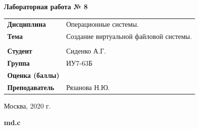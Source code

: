 \documentclass[a4paper,14pt]{extreport} %
\begin{document}
\begin{titlepage}
    \vspace{2cm}

    \begin{center}
        \textbf{Лабораторная работа № 8} \\
        \vspace{0.5cm}
    \end{center}

    \vspace{4cm}

    \begin{flushleft}
        \begin{tabular}{ll}
            \textbf{Дисциплина} & Операционные системы.  \\
            \textbf{Тема} & Создание виртуальной файловой системы.  \\
            \\
            \textbf{Студент} & Сиденко А.Г. \\
            \textbf{Группа} & ИУ7-63Б \\
            \textbf{Оценка (баллы)} & \\
            \textbf{Преподаватель} & Рязанова Н.Ю.   \\
        \end{tabular}
    \end{flushleft}

    \vspace{4cm}

   \begin{center}
        Москва, 2020 г.
    \end{center}

\end{titlepage}

\hfill

\textbf{md.c}
\end{document}
